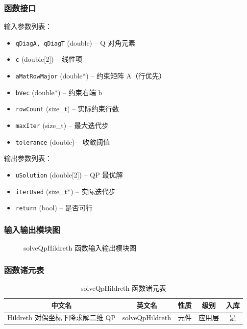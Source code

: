 \documentclass[a4paper,10pt]{article}
\begin{document}
\subsubsection{函数接口}
\par 输入参数列表：
\begin{itemize}
  \item \texttt{qDiagA, qDiagT} (double) -- Q 对角元素
  \item \texttt{c} (double[2]) -- 线性项
  \item \texttt{aMatRowMajor} (double*) -- 约束矩阵 A（行优先）
  \item \texttt{bVec} (double*) -- 约束右端 b
  \item \texttt{rowCount} (size\_t) -- 实际约束行数
  \item \texttt{maxIter} (size\_t) -- 最大迭代步
  \item \texttt{tolerance} (double) -- 收敛阈值
\end{itemize}
\par 输出参数列表：
\begin{itemize}
  \item \texttt{uSolution} (double[2]) -- QP 最优解
  \item \texttt{iterUsed} (size\_t*) -- 实际迭代步
  \item \texttt{return} (bool) -- 是否可行
\end{itemize}
\subsubsection{输入输出模块图}
\begin{figure}[h]
    \centering
    \caption{solveQpHildreth 函数输入输出模块图}
    \label{fig:io_solveQpHildreth}
\end{figure}
\subsubsection{函数诸元表}
\begin{table}[h]
    \centering
    \caption{solveQpHildreth 函数诸元表}
    \label{tab:meta_solveQpHildreth}
    \begin{tabular}{|c|c|c|c|c|}
        \hline
        中文名 & 英文名 & 性质 & 级别 & 入库 \\ \hline
        Hildreth 对偶坐标下降求解二维 QP & solveQpHildreth & 元件 & 应用层 & 是 \\ \hline
    \end{tabular}
\end{table}
\end{document}
